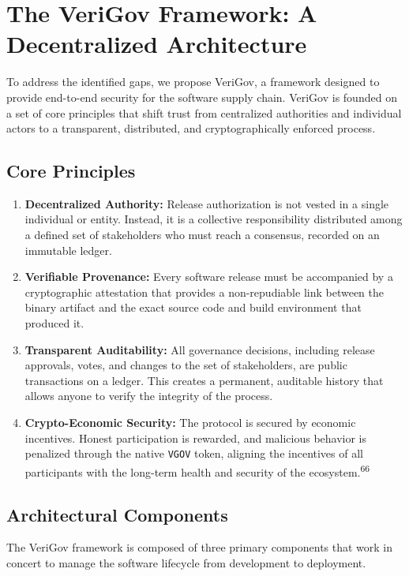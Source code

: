 \documentclass{article}
\begin{document}
\section{The VeriGov Framework: A Decentralized Architecture}
\label{sec:the-verigov-framework-a-decentralized-architectu}

To address the identified gaps, we propose VeriGov, a framework designed to provide end-to-end security for the software supply chain. VeriGov is founded on a set of core principles that shift trust from centralized authorities and individual actors to a transparent, distributed, and cryptographically enforced process.

\subsection{Core Principles}

\begin{enumerate}
\item \textbf{Decentralized Authority:} Release authorization is not vested in a single individual or entity. Instead, it is a collective responsibility distributed among a defined set of stakeholders who must reach a consensus, recorded on an immutable ledger.
\item \textbf{Verifiable Provenance:} Every software release must be accompanied by a cryptographic attestation that provides a non-repudiable link between the binary artifact and the exact source code and build environment that produced it.
\item \textbf{Transparent Auditability:} All governance decisions, including release approvals, votes, and changes to the set of stakeholders, are public transactions on a ledger. This creates a permanent, auditable history that allows anyone to verify the integrity of the process.
\item \textbf{Crypto-Economic Security:} The protocol is secured by economic incentives. Honest participation is rewarded, and malicious behavior is penalized through the native \lstinline{VGOV} token, aligning the incentives of all participants with the long-term health and security of the ecosystem.\textsuperscript{66}
\end{enumerate}

\subsection{Architectural Components}

The VeriGov framework is composed of three primary components that work in concert to manage the software lifecycle from development to deployment.
\end{document}
